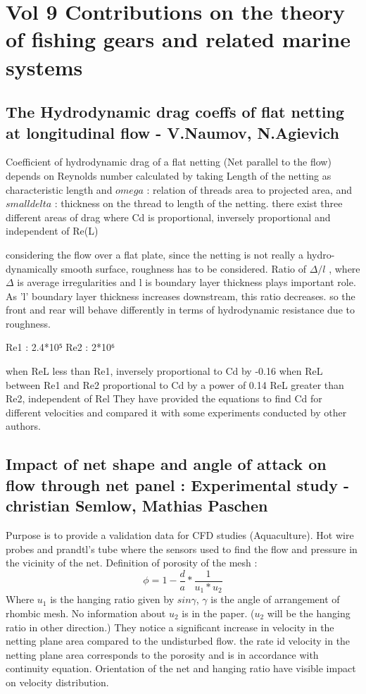 \documentclass[letterpaper,12pt]{article}
\begin{document}

\section{Vol 9 Contributions on the theory of fishing gears and related marine systems}

\subsection{The Hydrodynamic drag coeffs of flat netting at longitudinal flow - V.Naumov, N.Agievich}
Coefficient of hydrodynamic drag of a flat netting (Net parallel to the flow) depends on Reynolds number calculated by taking Length of the netting as characteristic length and \(omega\) : relation of threads area to projected area, and \(small delta\) : thickness on the thread to length of the netting. there exist three different areas of drag where Cd is proportional, inversely proportional and independent of Re(L)

considering the flow over a flat plate, since the netting is not really a hydro-dynamically smooth surface, roughness has to be considered. Ratio of $\Delta/l$ , where $\Delta$ is average irregularities and l is boundary layer thickness plays important role. As 'l' boundary layer thickness increases downstream, this ratio decreases.  so the front and rear will behave differently in terms of hydrodynamic resistance due to roughness.

Re1 : 2.4*10⁵ 
Re2 : 2*10⁶

when ReL less than Re1, inversely proportional to Cd by -0.16
when ReL between Re1 and Re2 proportional to Cd by a power of 0.14
ReL greater than Re2, independent of Rel 
They have provided the equations to find Cd for different velocities and compared it with some experiments conducted by other authors.
\subsection{Impact of net shape and angle of attack on flow through net panel : Experimental study - christian Semlow, Mathias Paschen}
Purpose is to provide a validation data for CFD studies (Aquaculture). Hot wire probes and prandtl's tube where the sensors used to find the flow and pressure in the vicinity of the net.
Definition of porosity of the mesh : 
\begin{equation}
    \phi= 1 - \frac{d}{a}*\frac{1}{u_1*u_2}
\end{equation}
Where $u_1$ is the hanging ratio given by $sin\gamma$, $\gamma$ is the angle of arrangement of rhombic mesh. No information about $u_2$ is in the paper. ($u_2$ will be the hanging ratio in other direction.)
They notice a significant increase in velocity in the netting plane area compared to the undisturbed flow. the rate id velocity in the netting plane area corresponds to the porosity and is in accordance with continuity equation. Orientation of the net and hanging ratio have visible impact on velocity distribution.
\end{document}

